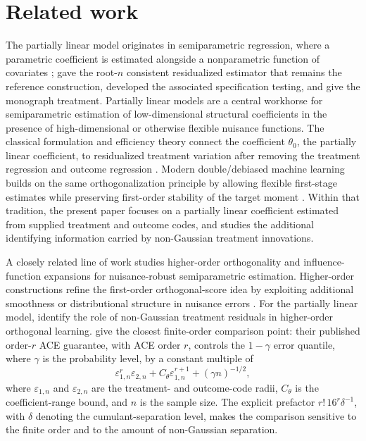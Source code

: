 \documentclass[11pt]{article}
\begin{document}
\section{Related work}

The partially linear model originates in semiparametric regression, where a parametric coefficient is estimated alongside a nonparametric function of covariates \citep{Engle1986,Speckman1988}; \citet{Robinson1988} gave the root-\(n\) consistent residualized estimator that remains the reference construction, \citet{HardleMammen1993} developed the associated specification testing, and \citet{HardleLiangGao2000} give the monograph treatment. Partially linear models are a central workhorse for semiparametric estimation of low-dimensional structural coefficients in the presence of high-dimensional or otherwise flexible nuisance functions. The classical formulation and efficiency theory connect the coefficient \(\theta_0\), the partially linear coefficient, to residualized treatment variation after removing the treatment regression and outcome regression \citep{Hansen1982,Newey1990,Newey1994,NeweyMcFadden1994,BickelKlaassenRitovWellner1993,VanDerVaart1998,VanDerVaartWellner1996}. Modern double/debiased machine learning builds on the same orthogonalization principle by allowing flexible first-stage estimates while preserving first-order stability of the target moment \citep{BelloniChernozhukovHansen2014,ChernozhukovEtAl2018DML}. Within that tradition, the present paper focuses on a partially linear coefficient estimated from supplied treatment and outcome codes, and studies the additional identifying information carried by non-Gaussian treatment innovations.

A closely related line of work studies higher-order orthogonality and influence-function expansions for nuisance-robust semiparametric estimation. Higher-order constructions refine the first-order orthogonal-score idea by exploiting additional smoothness or distributional structure in nuisance errors \citep{RobinsRotnitzkyZhao1994,VanDerLaanRubin2006,RobinsLiTchetgenVanDerVaart2008,LiuMukherjeeNeweyRobins2017,NeweyRobins2018,LiuMukherjeeRobinsTchetgen2021,ChernozhukovEscancianoIchimuraNeweyRobins2022}. For the partially linear model, \citet{MackeySyrgkanisZadik2018} identify the role of non-Gaussian treatment residuals in higher-order orthogonal learning. \citet{JinMackeySyrgkanis2025} give the closest finite-order comparison point: their published order-\(r\) ACE guarantee, with ACE order \(r\), controls the \(1-\gamma\) error quantile, where \(\gamma\) is the probability level, by a constant multiple of
\[
\varepsilon_{1,n}^r\varepsilon_{2,n}
+
C_{\theta}\varepsilon_{1,n}^{r+1}
+
(\gamma n)^{-1/2},
\]
where \(\varepsilon_{1,n}\) and \(\varepsilon_{2,n}\) are the treatment- and outcome-code radii, \(C_{\theta}\) is the coefficient-range bound, and \(n\) is the sample size. The explicit prefactor \(r!\,16^r\delta^{-1}\), with \(\delta\) denoting the cumulant-separation level, makes the comparison sensitive to the finite order and to the amount of non-Gaussian separation.
\end{document}
